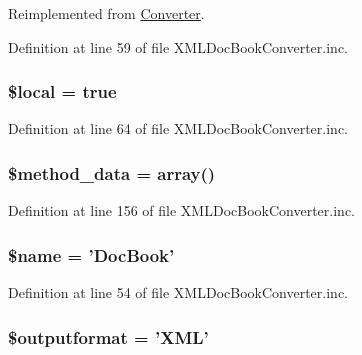 \-Reimplemented from \hyperlink{class_converter_ab49669c749559bb7833762878adb8f0c}{\-Converter}.



\-Definition at line 59 of file \-X\-M\-L\-Doc\-Book\-Converter.\-inc.

\hypertarget{class_x_m_l_doc_book_converter_a6d3acd7bb365291cea0fc4b71fe5682a}{
\subsubsection[{\$local}]{\setlength{\rightskip}{0pt plus 5cm}\$local = true}}\label{class_x_m_l_doc_book_converter_a6d3acd7bb365291cea0fc4b71fe5682a}


\-Definition at line 64 of file \-X\-M\-L\-Doc\-Book\-Converter.\-inc.

\hypertarget{class_x_m_l_doc_book_converter_a6ce6f073a68c637ae7f1eee6fd484090}{
\subsubsection[{\$method\-\_\-data}]{\setlength{\rightskip}{0pt plus 5cm}\$method\-\_\-data = array()}}\label{class_x_m_l_doc_book_converter_a6ce6f073a68c637ae7f1eee6fd484090}


\-Definition at line 156 of file \-X\-M\-L\-Doc\-Book\-Converter.\-inc.

\hypertarget{class_x_m_l_doc_book_converter_ab2fc40d43824ea3e1ce5d86dee0d763b}{
\subsubsection[{\$name}]{\setlength{\rightskip}{0pt plus 5cm}\$name = '\-Doc\-Book'}}\label{class_x_m_l_doc_book_converter_ab2fc40d43824ea3e1ce5d86dee0d763b}


\-Definition at line 54 of file \-X\-M\-L\-Doc\-Book\-Converter.\-inc.

\hypertarget{class_x_m_l_doc_book_converter_af0bfe153c049d957e8ea29b147025108}{
\subsubsection[{\$outputformat}]{\setlength{\rightskip}{0pt plus 5cm}\$outputformat = '\-X\-M\-L'}}\label{class_x_m_l_doc_book_converter_af0bfe153c049d957e8ea29b147025108}


